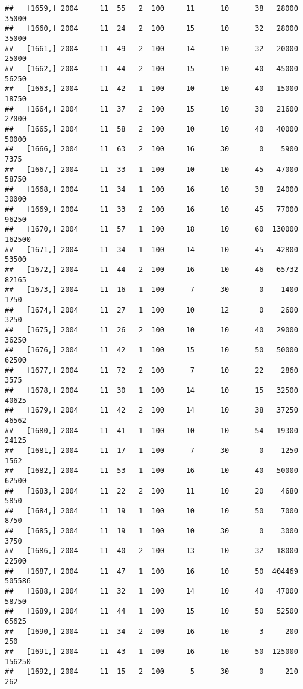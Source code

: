 \documentclass{article}\usepackage[]{graphicx}\usepackage[]{color}
\makeatletter
\newenvironment{kframe}{%
 \def\at@end@of@kframe{}%
 \ifinner\ifhmode%
  \def\at@end@of@kframe{\end{minipage}}%
  \begin{minipage}{\columnwidth}%
 \fi\fi%
 \def\FrameCommand##1{\hskip\@totalleftmargin \hskip-\fboxsep
 \colorbox{shadecolor}{##1}\hskip-\fboxsep
     \hskip-\linewidth \hskip-\@totalleftmargin \hskip\columnwidth}%
 \MakeFramed {\advance\hsize-\width
   \@totalleftmargin\z@ \linewidth\hsize
   \@setminipage}}%
 {\par\unskip\endMakeFramed%
 \at@end@of@kframe}
\newenvironment{knitrout}{}{} %
\makeatother
\begin{document}
\begin{knitrout}
\begin{kframe}
\begin{verbatim}
##   [1659,] 2004     11  55   2  100     11      10      38   28000   35000
##   [1660,] 2004     11  24   2  100     15      10      32   28000   35000
##   [1661,] 2004     11  49   2  100     14      10      32   20000   25000
##   [1662,] 2004     11  44   2  100     15      10      40   45000   56250
##   [1663,] 2004     11  42   1  100     10      10      40   15000   18750
##   [1664,] 2004     11  37   2  100     15      10      30   21600   27000
##   [1665,] 2004     11  58   2  100     10      10      40   40000   50000
##   [1666,] 2004     11  63   2  100     16      30       0    5900    7375
##   [1667,] 2004     11  33   1  100     10      10      45   47000   58750
##   [1668,] 2004     11  34   1  100     16      10      38   24000   30000
##   [1669,] 2004     11  33   2  100     16      10      45   77000   96250
##   [1670,] 2004     11  57   1  100     18      10      60  130000  162500
##   [1671,] 2004     11  34   1  100     14      10      45   42800   53500
##   [1672,] 2004     11  44   2  100     16      10      46   65732   82165
##   [1673,] 2004     11  16   1  100      7      30       0    1400    1750
##   [1674,] 2004     11  27   1  100     10      12       0    2600    3250
##   [1675,] 2004     11  26   2  100     10      10      40   29000   36250
##   [1676,] 2004     11  42   1  100     15      10      50   50000   62500
##   [1677,] 2004     11  72   2  100      7      10      22    2860    3575
##   [1678,] 2004     11  30   1  100     14      10      15   32500   40625
##   [1679,] 2004     11  42   2  100     14      10      38   37250   46562
##   [1680,] 2004     11  41   1  100     10      10      54   19300   24125
##   [1681,] 2004     11  17   1  100      7      30       0    1250    1562
##   [1682,] 2004     11  53   1  100     16      10      40   50000   62500
##   [1683,] 2004     11  22   2  100     11      10      20    4680    5850
##   [1684,] 2004     11  19   1  100     10      10      50    7000    8750
##   [1685,] 2004     11  19   1  100     10      30       0    3000    3750
##   [1686,] 2004     11  40   2  100     13      10      32   18000   22500
##   [1687,] 2004     11  47   1  100     16      10      50  404469  505586
##   [1688,] 2004     11  32   1  100     14      10      40   47000   58750
##   [1689,] 2004     11  44   1  100     15      10      50   52500   65625
##   [1690,] 2004     11  34   2  100     16      10       3     200     250
##   [1691,] 2004     11  43   1  100     16      10      50  125000  156250
##   [1692,] 2004     11  15   2  100      5      30       0     210     262

\end{verbatim}
\end{kframe}
\end{knitrout}
\end{document}
